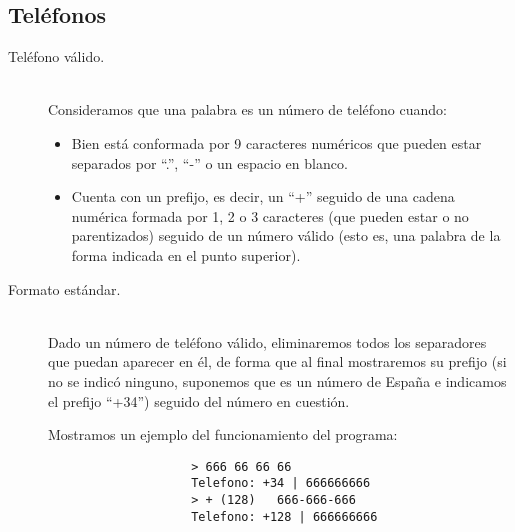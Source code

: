 \documentclass[12pt]{article}
\begin{document}
    \subsection{Teléfonos}
    \begin{description}
        \item [Teléfono válido.]~\\
            Consideramos que una palabra es un número de teléfono cuando:
            \begin{itemize}
                \item Bien está conformada por 9 caracteres numéricos que pueden estar separados por ``.'', ``-'' o un espacio en blanco.
                \item Cuenta con un prefijo, es decir, un ``+'' seguido de una cadena numérica formada por 1, 2 o 3 caracteres (que pueden estar o no parentizados) seguido de un número válido (esto es, una palabra de la forma indicada en el punto superior).
            \end{itemize}
        \item [Formato estándar.]~\\
            Dado un número de teléfono válido, eliminaremos todos los separadores que puedan aparecer en él, de forma que al final mostraremos su prefijo (si no se indicó ninguno, suponemos que es un número de España e indicamos el prefijo ``+34'') seguido del número en cuestión.
            \begin{ejemplo}
                Mostramos un ejemplo del funcionamiento del programa:
                \begin{verbatim}
                    > 666 66 66 66
                    Telefono: +34 | 666666666
                    > + (128)   666-666-666
                    Telefono: +128 | 666666666
                \end{verbatim}
            \end{ejemplo}
    \end{description}
\end{document}
